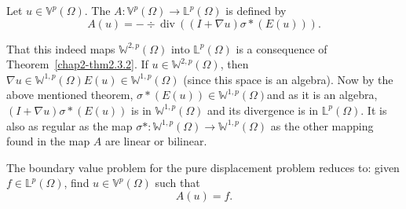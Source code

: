 Let $u \in \mathbb{V}^p ( \Omega)$. The $A: \mathbb{V}^p(\Omega) \to
\mathbb{L}^{p}(\Omega)$ is defined by 
 \begin{equation*}
   A(u) =- \div ~\text{div}~ (( I + \nabla u ) \sigma*
   (E(u))). \tag{2.3-21} \label{eq2.3-21}
 \end{equation*} 
 
 That this indeed maps $ \mathbb{W}^{2,p}( \Omega ) $ into $
 \mathbb{L}^p ( \Omega ) $ is a consequence of
 Theorem~\ref{chap2-thm2.3.2}. If $u  \in \mathbb{W}^{2,p}( \Omega)$,
 then $\nabla u \in 
 \mathbb{W}^{1,p}( \Omega) E(u) \in \mathbb{W}^{1,p}( \Omega)$ (since
 this space is an algebra). Now by the above mentioned theorem, $
 \sigma* (E (u)) \in \mathbb{W}^{1,p}( \Omega)$\pageoriginale and as it is an
 algebra, $(I + \nabla u) \sigma * ( E(u)) $ is in
 $\mathbb{W}^{1,p}( \Omega)$ and its divergence is in $\mathbb{L}^p
 (\Omega)$. It is also as regular as the map $ \sigma * :
 \mathbb{W}^{1,p}( \Omega) \to \mathbb{W}^{1,p}( \Omega)$ as the other
 mapping found in the map $A$ are linear or bilinear. 
 
The boundary value problem for the pure displacement problem reduces
to: given $ f \in \mathbb{L}^p (\Omega )$, find $u \in \mathbb{V}^p
(\Omega)$ such that 
\begin{equation*}
  A(u) =f. \tag {2.3-22}\label{eq2.3-22}
\end{equation*} 


